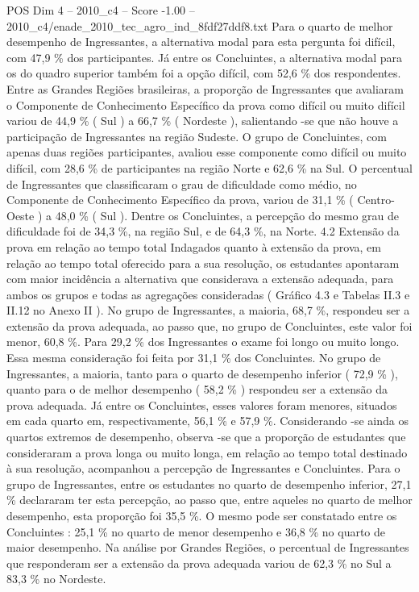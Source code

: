 \begin{textsample}{POS Dim 4 – 2010\_c4 – Score -1.00 – 2010\_c4/enade\_2010\_tec\_agro\_ind\_8fdf27ddf8.txt}
Para o quarto de melhor desempenho de Ingressantes, a alternativa modal para esta pergunta foi difícil, com 47,9 \% dos participantes.
Já entre os Concluintes, a alternativa modal para os do quadro superior também foi a opção difícil, com 52,6 \% dos respondentes.
Entre as Grandes Regiões brasileiras, a proporção de Ingressantes que avaliaram o Componente de Conhecimento Específico da prova como difícil ou muito difícil variou de 44,9 \% ( Sul ) a 66,7 \% ( Nordeste ), salientando -se que não houve a participação de Ingressantes na região Sudeste.
O grupo de Concluintes, com apenas duas regiões participantes, avaliou esse componente como difícil ou muito difícil, com 28,6 \% de participantes na região Norte e 62,6 \% na Sul.
O percentual de Ingressantes que classificaram o grau de dificuldade como médio, no Componente de Conhecimento Específico da prova, variou de 31,1 \% ( Centro-Oeste ) a 48,0 \% ( Sul ).
Dentre os Concluintes, a percepção do mesmo grau de dificuldade foi de 34,3 \%, na região Sul, e de 64,3 \%, na Norte. 4.2 Extensão da prova em relação ao tempo total Indagados quanto à extensão da prova, em relação ao tempo total oferecido para a sua resolução, os estudantes apontaram com maior incidência a alternativa que considerava a extensão adequada, para ambos os grupos e todas as agregações consideradas ( Gráfico 4.3 e Tabelas II.3 e II.12 no Anexo II ).
No grupo de Ingressantes, a maioria, 68,7 \%, respondeu ser a extensão da prova adequada, ao passo que, no grupo de Concluintes, este valor foi menor, 60,8 \%.
Para 29,2 \% dos Ingressantes o exame foi longo ou muito longo.
Essa mesma consideração foi feita por 31,1 \% dos Concluintes.
No grupo de Ingressantes, a maioria, tanto para o quarto de desempenho inferior ( 72,9 \% ), quanto para o de melhor desempenho ( 58,2 \% ) respondeu ser a extensão da prova adequada.
Já entre os Concluintes, esses valores foram menores, situados em cada quarto em, respectivamente, 56,1 \% e 57,9 \%.
Considerando -se ainda os quartos extremos de desempenho, observa -se que a proporção de estudantes que consideraram a prova longa ou muito longa, em relação ao tempo total destinado à sua resolução, acompanhou a percepção de Ingressantes e Concluintes.
Para o grupo de Ingressantes, entre os estudantes no quarto de desempenho inferior, 27,1 \% declararam ter esta percepção, ao passo que, entre aqueles no quarto de melhor desempenho, esta proporção foi 35,5 \%.
O mesmo pode ser constatado entre os Concluintes : 25,1 \% no quarto de menor desempenho e 36,8 \% no quarto de maior desempenho.
Na análise por Grandes Regiões, o percentual de Ingressantes que responderam ser a extensão da prova adequada variou de 62,3 \% no Sul a 83,3 \% no Nordeste.

\end{textsample}
